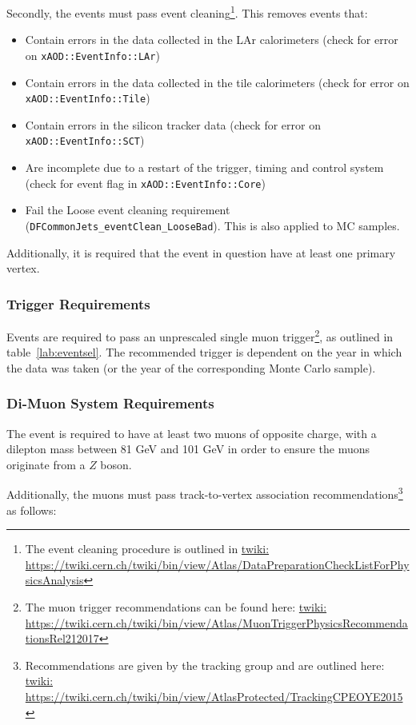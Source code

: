Secondly, the events must pass event cleaning\footnote{The event cleaning procedure is outlined in \url{twiki: https://twiki.cern.ch/twiki/bin/view/Atlas/DataPreparationCheckListForPhysicsAnalysis}}. This removes events that:
\begin{itemize}
    \item Contain errors in the data collected in the LAr calorimeters (check for error on \texttt{xAOD::EventInfo::LAr})
    \item Contain errors in the data collected in the tile calorimeters (check for error on \texttt{xAOD::EventInfo::Tile})
    \item Contain errors in the silicon tracker data (check for error on \texttt{xAOD::EventInfo::SCT})
    \item Are incomplete due to a restart of the trigger, timing and control system (check for event flag in \texttt{xAOD::EventInfo::Core})
    \item Fail the Loose event cleaning requirement (\texttt{DFCommonJets\_eventClean\_LooseBad}). This is also applied to MC samples.
\end{itemize}

Additionally, it is required that the event in question have at least one primary vertex.

\subsubsection{Trigger Requirements}
\label{subsubsec:trigger}
Events are required to pass an unprescaled single muon trigger\footnote{The muon trigger recommendations can be found here: \url{twiki: https://twiki.cern.ch/twiki/bin/view/Atlas/MuonTriggerPhysicsRecommendationsRel212017}}, as outlined in table~\ref{lab:eventsel}.
The recommended trigger is dependent on the year in which the data was taken (or the year of the corresponding Monte Carlo sample).

\subsubsection{Di-Muon System Requirements}
The event is required to have at least two muons of opposite charge, with a dilepton mass between 81 GeV and 101 GeV in order to ensure the muons originate from a $Z$ boson.

Additionally, the muons must pass track-to-vertex association recommendations\footnote{Recommendations are given by the tracking group and are outlined here: \url{twiki: https://twiki.cern.ch/twiki/bin/view/AtlasProtected/TrackingCPEOYE2015}} as follows:

